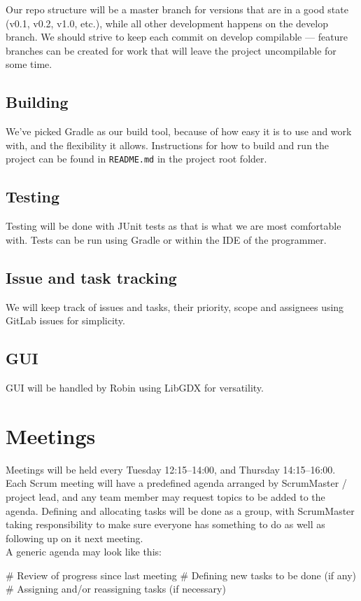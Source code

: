 \documentclass{article}
\begin{document}
Our repo structure will be a master branch for versions that are in a good state (v0.1, v0.2, v1.0, etc.), while all other development happens on the develop branch. We should strive to keep each commit on develop compilable --- feature branches can be created for work that will leave the project uncompilable for some time.

\subsection*{Building}

We've picked Gradle as our build tool, because of how easy it is to use and work with, and the flexibility it allows. Instructions for how to build and run the project can be found in \texttt{README.md} in the project root folder.

\subsection*{Testing}

Testing will be done with JUnit tests as that is what we are most comfortable with. Tests can be run using Gradle or within the IDE of the programmer.

\subsection*{Issue and task tracking}

We will keep track of issues and tasks, their priority, scope and assignees using GitLab issues for simplicity.

\subsection*{GUI}

GUI will be handled by Robin using LibGDX for versatility.

\section*{Meetings}

Meetings will be held every Tuesday 12:15--14:00, and Thursday 14:15--16:00. Each Scrum meeting will have a predefined agenda arranged by ScrumMaster / project lead, and any team member may request topics to be added to the agenda. Defining and allocating tasks will be done as a group, with ScrumMaster taking responsibility to make sure everyone has something to do as well as following up on it next meeting.\\

A generic agenda may look like this:\\

\begin{easylist}[enumerate]
    # Review of progress since last meeting
    # Defining new tasks to be done (if any)
    # Assigning and/or reassigning tasks (if necessary)
\end{easylist}
\end{document}

